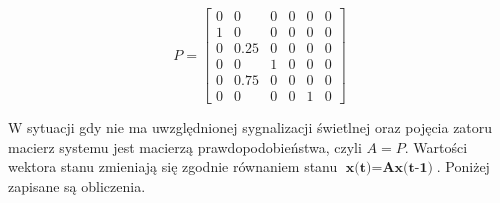 \documentclass[12pt]{book}
\theoremstyle{plain}
\begin{document}
\def \P {\begin{bmatrix}
		0 & 0 & 0 & 0 & 0 & 0 \\
		1 & 0 & 0 & 0 & 0 & 0 \\
		0 & 0.25 & 0 & 0 & 0 & 0 \\
		0 & 0 & 1 & 0 & 0 & 0 \\
		0 & 0.75 & 0 & 0 & 0 & 0 \\
		0 & 0 & 0 & 0 & 1 & 0 
\end{bmatrix}}
\[P=\P\]





\def \A{
\begin{bmatrix}
	0 & 0    & 0 & 0 & 0 & 0 \\
	1 & 0    & 0 & 0 & 0 & 0 \\
	0 & 0.25 & 0 & 0 & 0 & 0 \\
	0 & 0    & 1 & 0 & 0 & 0 \\
	0 & 0.75 & 0 & 0 & 0 & 0 \\
	0 & 0    & 0 & 0 & 1 & 0 
\end{bmatrix}
}
\begin{flushleft}
W sytuacji gdy nie ma uwzględnionej sygnalizacji świetlnej oraz pojęcia zatoru macierz systemu jest macierzą prawdopodobieństwa, czyli $A=P$. \linebreak Wartości wektora stanu zmieniają się zgodnie równaniem stanu $\textbf{x(t)}=\textbf{Ax(t-1)}$. Poniżej zapisane są obliczenia.
\end{flushleft}
\end{document}
